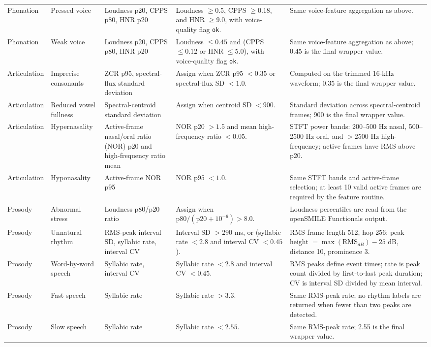 \documentclass[10pt]{article}
\begin{document}
\begin{landscape}
\begin{longtable}{L{0.75in}L{1.05in}L{1.80in}L{2.45in}L{2.45in}}
Phonation & Pressed voice & Loudness p20, CPPS p80, HNR p20 & Loudness $\ge0.5$, CPPS $\ge0.18$, and HNR $\ge9.0$, with voice-quality flag \texttt{ok}. & Same voice-feature aggregation as above. \\
Phonation & Weak voice & Loudness p20, CPPS p80, HNR p20 & Loudness $\le0.45$ and (CPPS $\le0.12$ or HNR $\le5.0$), with voice-quality flag \texttt{ok}. & Same voice-feature aggregation as above; 0.45 is the final wrapper value. \\
\midrule
Articulation & Imprecise consonants & ZCR p95, spectral-flux standard deviation & Assign when ZCR p95 $<0.35$ or spectral-flux SD $<1.0$. & Computed on the trimmed 16-kHz waveform; 0.35 is the final wrapper value. \\
Articulation & Reduced vowel fullness & Spectral-centroid standard deviation & Assign when centroid SD $<900$. & Standard deviation across spectral-centroid frames; 900 is the final wrapper value. \\
Articulation & Hypernasality & Active-frame nasal/oral ratio (NOR) p20 and high-frequency ratio mean & NOR p20 $>1.5$ and mean high-frequency ratio $<0.05$. & STFT power bands: 200--500 Hz nasal, 500--2500 Hz oral, and $>2500$ Hz high-frequency; active frames have RMS above p20. \\
Articulation & Hyponasality & Active-frame NOR p95 & NOR p95 $<1.0$. & Same STFT bands and active-frame selection; at least 10 valid active frames are required by the feature routine. \\
\midrule
Prosody & Abnormal stress & Loudness p80/p20 ratio & Assign when $\mathrm{p80}/(\mathrm{p20}+10^{-6})>8.0$. & Loudness percentiles are read from the openSMILE Functionals output. \\
Prosody & Unnatural rhythm & RMS-peak interval SD, syllabic rate, interval CV & Interval SD $>290$ ms, or (syllabic rate $<2.8$ and interval CV $<0.45$). & RMS frame length 512, hop 256; peak height $=\max(\mathrm{RMS}_{dB})-25$ dB, distance 10, prominence 3. \\
Prosody & Word-by-word speech & Syllabic rate, interval CV & Syllabic rate $<2.8$ and interval CV $<0.45$. & RMS peaks define event times; rate is peak count divided by first-to-last peak duration; CV is interval SD divided by mean interval. \\
Prosody & Fast speech & Syllabic rate & Syllabic rate $>3.3$. & Same RMS-peak rate; no rhythm labels are returned when fewer than two peaks are detected. \\
Prosody & Slow speech & Syllabic rate & Syllabic rate $<2.55$. & Same RMS-peak rate; 2.55 is the final wrapper value. \\

\end{longtable}
\end{landscape}
\end{document}
